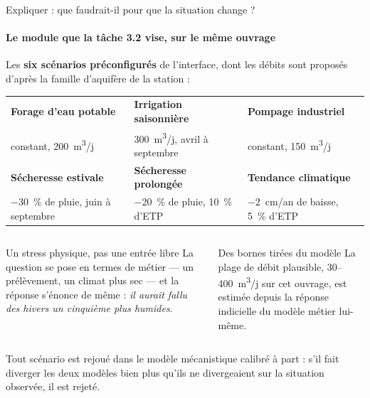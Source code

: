 \documentclass[aspectratio=169,11pt]{beamer}
\begin{document}
\begin{frame}{Expliquer : que faudrait-il pour que la situation change ?}
\framesubtitle{Le module que la tâche 3.2 vise, sur le même ouvrage}

\vspace{0.1cm}
{\footnotesize Les \textbf{six scénarios préconfigurés} de l'interface, dont les débits sont
proposés d'après la famille d'aquifère de la station :\par}
\vspace{0.15em}
{\scriptsize
\begin{tabularx}{\linewidth}{@{}YYY@{}}
\textbf{Forage d'eau potable} & \textbf{Irrigation saisonnière} & \textbf{Pompage industriel} \\
constant, \num{200}~m\textsuperscript{3}/j & \num{300}~m\textsuperscript{3}/j, avril à septembre &
constant, \num{150}~m\textsuperscript{3}/j \\[0.35em]
\textbf{Sécheresse estivale} & \textbf{Sécheresse prolongée} & \textbf{Tendance climatique} \\
\SI{-30}{\percent} de pluie, juin à septembre & \SI{-20}{\percent} de pluie, \SI{+10}{\percent}
d'ETP & \num{-2}~cm/an de baisse, \SI{+5}{\percent} d'ETP \\
\end{tabularx}\par}

\vspace{0.35cm}
\begin{columns}[T]
\begin{column}{0.47\textwidth}
\footnotesize
\begin{apport}{Un stress physique, pas une entrée libre}
La question se pose en termes de métier — un prélèvement, un climat plus sec — et la réponse
s'énonce de même : \emph{il aurait fallu des hivers un cinquième plus humides}.
\end{apport}
\end{column}

\begin{column}{0.47\textwidth}
\footnotesize
\begin{apport}{Des bornes tirées du modèle}
La plage de débit plausible, \numrange{30}{400}~m\textsuperscript{3}/j sur cet ouvrage, est
estimée depuis la réponse indicielle du modèle métier lui-même.
\end{apport}
\end{column}
\end{columns}

\vspace{0.1cm}
{\scriptsize\color{grisardoise} Tout scénario est rejoué dans le modèle mécanistique calibré à
part : s'il fait diverger les deux modèles bien plus qu'ils ne divergeaient sur la situation
observée, il est rejeté.\par}
\vspace{0.1cm}
\end{frame}
\end{document}
